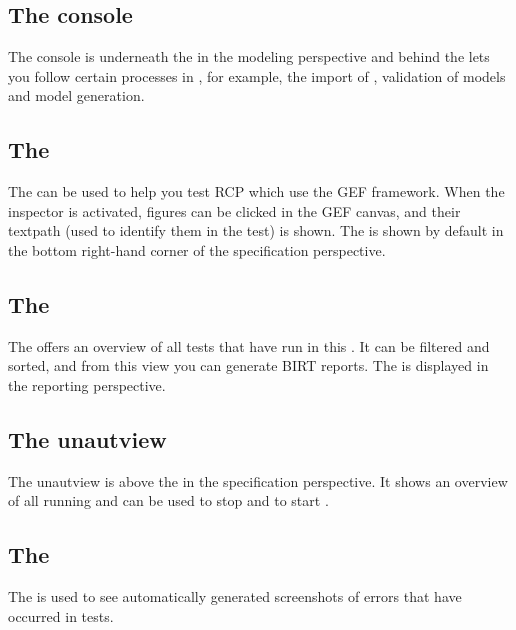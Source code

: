 \subsection{The console}
The console is underneath the \gdmodeleditor{} in the modeling perspective and behind the \gdcompnamesview{} lets you follow certain processes in \jb{}, for example, the import of \gdprojects{}, validation of models and model generation. 

\subsection{The \gdinspector{}}
The \gdinspector{} can be used to help you test RCP \gdauts{} which use the GEF framework. When the inspector is activated, figures can be clicked in the GEF canvas, and their textpath (used to identify them in the test) is shown. The \gdinspector{} is shown by default in the bottom right-hand corner of the specification perspective. 

\subsection{The \gdtestsummaryview{}}
The \gdtestsummaryview{} offers an overview of all tests that have run in this \gddb{}. It can be filtered and sorted, and from this view you can generate \jb{} BIRT reports. The \gdtestsummaryview{} is displayed in the \jb{} reporting perspective. 

\subsection{The \jb{}unautview{}}
The \jb{}unautview{} is above the \gdtestsuitebrowser{} in the specification perspective. It shows an overview of all running \gdauts{} and can be used to stop \gdauts{} and to start \gdsuites{}.  

\subsection{The \gdimgview{}}
The \gdimgview{} is used to see automatically generated screenshots of errors that have occurred in tests.
